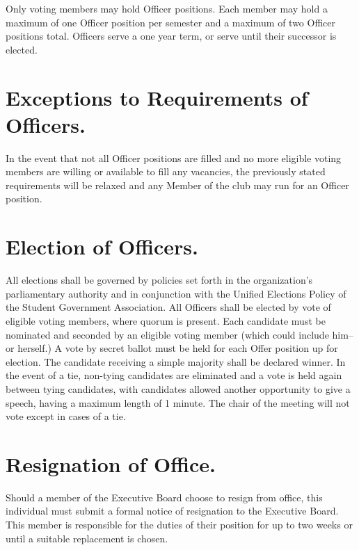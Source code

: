 \documentclass[12pt]{constitution}
\begin{document}
Only voting members may hold Officer positions. Each member may hold a maximum
of one Officer position per semester and a maximum of two Officer positions
total. Officers serve a one year term, or serve until their successor is
elected.

\section{Exceptions to Requirements of Officers.}\label{sec:REQUIREMENTS-OF-OFFICERS-EXCEPTIONS}

In the event that not all Officer positions are filled and no more eligible
voting members are willing or available to fill any vacancies, the previously
stated requirements will be relaxed and any Member of the club may run for an
Officer position.

\section{Election of Officers.}\label{sec:ELECTION-OF-OFFICERS}

All elections shall be governed by policies set forth in the organization’s
parliamentary authority and in conjunction with the Unified Elections Policy of
the Student Government Association. All Officers shall be elected by vote of
eligible voting members, where quorum is present. Each candidate must be
nominated and seconded by an eligible voting member (which could include him--
or herself.) A vote by secret ballot must be held for each Offer position up for
election. The candidate receiving a simple majority shall be declared winner. In
the event of a tie, non-tying candidates are eliminated and a vote is held again
between tying candidates, with candidates allowed another opportunity to give a
speech, having a maximum length of 1 minute. The chair of the meeting will not
vote except in cases of a tie.

\section{Resignation of Office.}\label{sec:RESIGNATION-OF-OFFICE}

Should a member of the Executive Board choose to resign from office, this
individual must submit a formal notice of resignation to the Executive Board.
This member is responsible for the duties of their position for up to two weeks
or until a suitable replacement is chosen.
\end{document}

